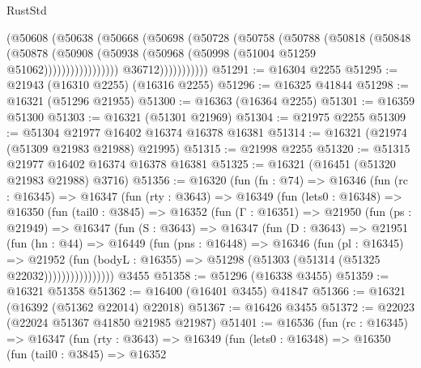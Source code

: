 \begin{lexlean}{RustStd}
\begin{coremodule}
                              (@50608
                                (@50638
                                  (@50668
                                    (@50698
                                      (@50728
                                        (@50758
                                          (@50788
                                            (@50818
                                              (@50848
                                                (@50878
                                                  (@50908
                                                    (@50938
                                                      (@50968
                                                        (@50998
                                                          (@51004 @51259 @51062)))))))))))))))))
                          @36712)))))))))))
@51291 := @16304 @2255
@51295 := @21943 (@16310 @2255) (@16316 @2255)
@51296 := @16325 @41844
@51298 := @16321 (@51296 @21955)
@51300 := @16363 (@16364 @2255)
@51301 := @16359 @51300
@51303 := @16321 (@51301 @21969)
@51304 := @21975 @2255
@51309 := @51304 @21977 @16402 @16374 @16378 @16381
@51314 := @16321 (@21974 (@51309 @21983 @21988) @21995)
@51315 := @21998 @2255
@51320 := @51315 @21977 @16402 @16374 @16378 @16381
@51325 := @16321 (@16451 (@51320 @21983 @21988) @3716)
@51356 := @16320
    (fun (fn : @74) =>
    @16346
      (fun (rc : @16345) =>
      @16347
        (fun (rty : @3643) =>
        @16349
          (fun (lets0 : @16348) =>
          @16350
            (fun (tail0 : @3845) =>
            @16352
              (fun (Γ : @16351) =>
              @21950
                (fun (ps : @21949) =>
                @16347
                  (fun (S : @3643) =>
                  @16347
                    (fun (D : @3643) =>
                    @21951
                      (fun (hn : @44) =>
                      @16449
                        (fun (pns : @16448) =>
                        @16346
                          (fun (pl : @16345) =>
                          @21952
                            (fun (bodyL : @16355) =>
                            @51298 (@51303 (@51314 (@51325 @22032))))))))))))))))
    @3455
@51358 := @51296 (@16338 @3455)
@51359 := @16321 @51358
@51362 := @16400 (@16401 @3455) @41847
@51366 := @16321 (@16392 (@51362 @22014) @22018)
@51367 := @16426 @3455
@51372 := @22023 (@22024 @51367 @41850 @21985 @21987)
@51401 := @16536
    (fun (rc : @16345) =>
    @16347
      (fun (rty : @3643) =>
      @16349
        (fun (lets0 : @16348) =>
        @16350
          (fun (tail0 : @3845) =>
          @16352

\end{coremodule}
\end{lexlean}
